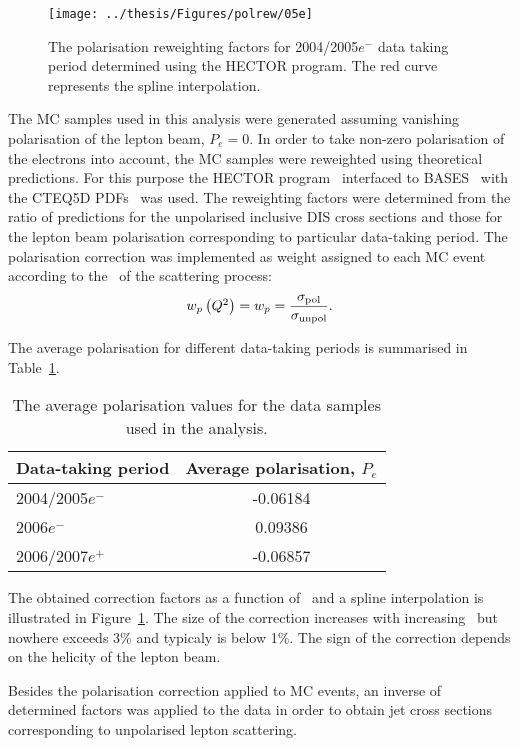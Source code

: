 \label{sec:polcor}
\begin{figure}[h]
 \begin{center}
 \texttt{[image: ../thesis/Figures/polrew/05e]}
\end{center}
\caption{The polarisation reweighting factors for 2004/2005$e^-$ data taking period determined using the HECTOR program. The red curve represents the spline interpolation.}
\label{fig:polcor05e}
\end{figure} 
The MC samples used in this analysis were generated assuming vanishing polarisation of the lepton beam, $P_e = 0$. In order to take non-zero polarisation of the electrons into account, the MC samples were reweighted using theoretical predictions. For this purpose the HECTOR program~\cite{HECTOR} interfaced to BASES~\cite{bases} with the CTEQ5D PDFs~\cite{CTEQ5} was used. The reweighting factors were determined from the ratio of predictions for the unpolarised inclusive DIS cross sections and those for the lepton beam polarisation corresponding to particular data-taking period. The polarisation correction was implemented as weight assigned to each MC event according to the \qsq~of the scattering process:
\begin{equation}
 w_p\left(\mbox{${Q^2}$}\right) = w_p = \frac{\sigma_\mathrm{pol}}{\sigma_\mathrm{unpol}}.
\end{equation}

The average polarisation for different data-taking periods is summarised in Table~\ref{tab:polvalues}.
\begin{table}[h]
 \centering
 \begin{tabular}{lc}
 Data-taking period & Average polarisation, $P_e$ \\
\hline
 2004/2005$e^-$   & -0.06184 \\
 2006$e^-$   & 0.09386  \\
 2006/2007$e^+$ & -0.06857
\end{tabular} 
\caption{The average polarisation values for the data samples used in the analysis.}
\label{tab:polvalues}
\end{table}
The obtained correction factors as a function of \qsq~and a spline interpolation is illustrated in Figure~\ref{fig:polcor05e}. The size of the correction increases with increasing \qsq~but nowhere exceeds 3\% and typicaly is below 1\%. The sign of the correction depends on the helicity of the lepton beam.

Besides the polarisation correction applied to MC events, an inverse of determined factors was applied to the data in order to obtain jet cross sections corresponding to unpolarised lepton scattering.